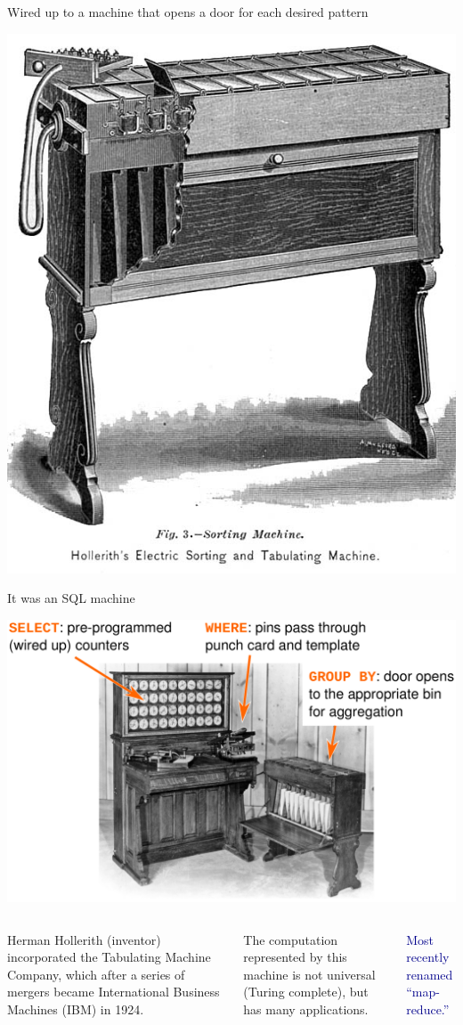 \documentclass[aspectratio=169]{beamer}
\begin{document}
\begin{frame}{Wired up to a machine that opens a door for each desired pattern}
\vspace{0.25 cm}
\begin{center}
\includegraphics[width=0.45\linewidth]{1890_Hollerith_Sorting_Machine_OM.jpg}
\end{center}
\end{frame}

\begin{frame}{It was an SQL machine}
\vspace{0.25 cm}
\begin{center}
\includegraphics[width=0.85\linewidth]{hh-tabulator.pdf}
\end{center}
\end{frame}

\begin{frame}{}
\large
\vspace{1.25 cm}
\begin{columns}
Herman Hollerith (inventor) incorporated the Tabulating Machine Company, which after a series of mergers became International Business Machines (IBM) in 1924.

\vspace{1 cm}
The computation represented by this machine is not universal (Turing complete), but has many applications.

\vspace{0.75 cm}
\begin{center}
\textcolor{darkblue}{Most recently renamed ``map-reduce.''}
\end{center}
\end{columns}
\end{frame}
\end{document}
